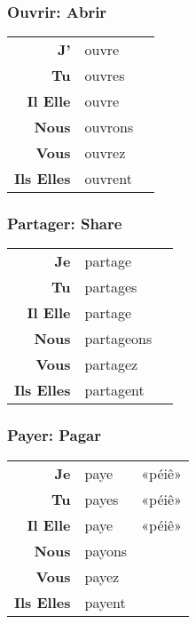 \documentclass{subfiles}
\begin{document}
\begin{multicols*}{3}
        \subsubsection{Ouvrir: Abrir}
            \begin{tabular}{r l r}
                \textbf{J'}        & ouvre   &\\
                \textbf{Tu}        & ouvres  &\\
                \textbf{Il Elle}   & ouvre   &\\
                \textbf{Nous}      & ouvrons &\\
                \textbf{Vous}      & ouvrez  &\\
                \textbf{Ils Elles} & ouvrent &
            \end{tabular}

        \subsubsection{Partager: Share}
            \begin{tabular}{r l r}
                \textbf{Je}        & partage    &\\
                \textbf{Tu}        & partages   &\\
                \textbf{Il Elle}   & partage    &\\
                \textbf{Nous}      & partageons &\\
                \textbf{Vous}      & partagez   &\\
                \textbf{Ils Elles} & partagent  &
            \end{tabular}

        \subsubsection{Payer: Pagar}
            \begin{tabular}{r l r}
                \textbf{Je}        & paye   & «péiê»\\
                \textbf{Tu}        & payes  & «péiê»\\
                \textbf{Il Elle}   & paye   & «péiê»\\
                \textbf{Nous}      & payons &\\
                \textbf{Vous}      & payez  &\\
                \textbf{Ils Elles} & payent &
            \end{tabular}


\end{multicols*}
\end{document}
